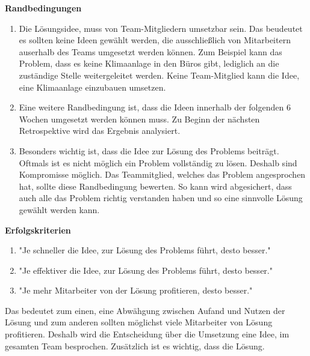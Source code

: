 \textbf{Randbedingungen}
\begin{enumerate}
    \item Die Lösungsidee, muss von Team-Mitgliedern umsetzbar sein. Das beudeutet es sollten keine Ideen gewählt werden, die ausschließlich von Mitarbeitern auserhalb des Teams
    umgesetzt werden können. Zum Beispiel kann das Problem, dass es keine Klimaanlage in den Büros gibt, lediglich an die zuständige Stelle weitergeleitet werden.
    Keine Team-Mitglied kann die Idee, eine Klimaanlage einzubauen umsetzen. 
    \item Eine weitere Randbedingung ist, dass die Ideen innerhalb der folgenden 6 Wochen umgesetzt werden können muss. Zu Beginn der 
    nächsten Retrospektive wird das Ergebnis analysiert.
    \item Besonders wichtig ist, dass die Idee zur Lösung des Problems beiträgt. Oftmals ist es nicht möglich ein Problem vollständig zu lösen. 
    Deshalb sind Kompromisse möglich. Das Teammitglied, welches das Problem angesprochen hat, sollte diese Randbedingung bewerten. So kann 
    wird abgesichert, dass auch alle das Problem richtig verstanden haben und so eine sinnvolle Lösung gewählt werden kann. 
\end{enumerate}
\textbf{Erfolgskriterien}
\begin{enumerate}
    \item "Je schneller die Idee, zur Lösung des Problems führt, desto besser." 
    \item "Je effektiver die Idee, zur Lösung des Problems führt, desto besser."
    \item "Je mehr Mitarbeiter von der Lösung profitieren, desto besser."
\end{enumerate}

Das bedeutet zum einen, eine Abwähgung zwischen Aufand und Nutzen der Lösung und zum anderen sollten möglichst viele Mitarbeiter 
von Lösung profitieren. Deshalb wird die Entscheidung über die Umsetzung eine Idee, im gesamten Team besprochen. Zusätzlich ist es wichtig,
dass die Lösung. 